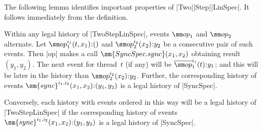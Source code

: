 

The following lemma identifies important properties of
|Two|\-|Step|\-|LinSpec|.  It follows immediately from the
definition.
%
\begin{lemma}
\label{lem:TwoStepLinSpec-histories}
Within any legal history of |TwoStepLinSpec|, events $\op_1$ and
$\op_2$ alternate.  Let $\op_1^{i_1}(t,x_1) \:: ()$ and $\op_2^{i_2}(x_2) \::
y_2$ be a consecutive pair of such events.  Then |op| makes a call
$\sm{SyncSpec.sync}(x_1, x_2)$ obtaining result $(y_1,y_2)$.  The next event
for thread~$t$ (if any) will be $\overline\op_1^{i_1}(t) \:: y_1$; and this
will be later in the history than $\op_2^{i_2}(x_2) \:: y_2$.  Further, the
corresponding history of events $\sm{sync}^{i_1,i_2}(x_1,x_2) \:: (y_1,y_2)$
is a legal history of |SyncSpec|.

Conversely, each history with events ordered in this way will be a legal
history of |TwoStepLinSpec| if  the corresponding history
of events $\sm{sync}^{i_1,i_2}(x_1,x_2) \:: (y_1,y_2)$ is a legal history of
|SyncSpec|.
\end{lemma}


